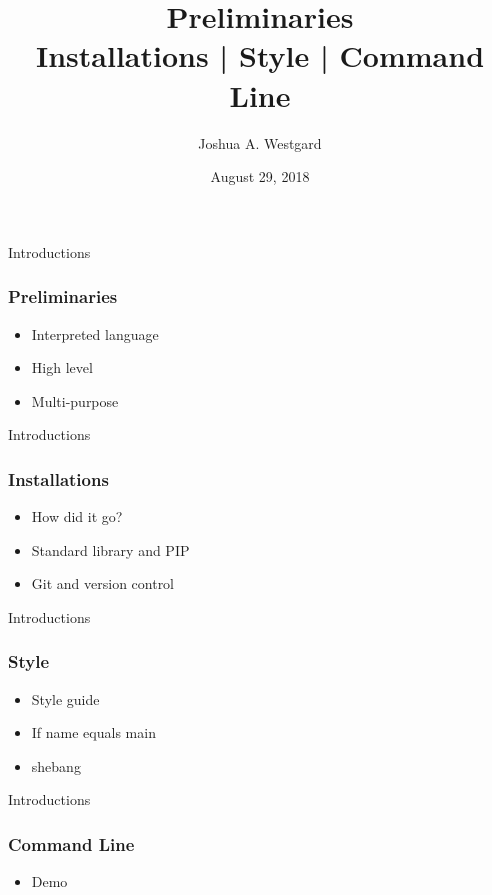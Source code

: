 \documentclass{beamer}
\title[INST: 326: Preliminary Concerns]{Preliminaries\\Installations | Style | Command Line}
\author{Joshua A. Westgard}
\institute{UMD iSchool}
\date{August 29, 2018}
\begin{document}
\begin{frame}
\titlepage
\end{frame}

\begin{frame}{Introductions}
\frametitle{Preliminaries}
\begin{itemize}
\item Interpreted language
\pause \item High level
\pause \item Multi-purpose
\end{itemize}
\end{frame}

\begin{frame}{Introductions}
\frametitle{Installations}
\begin{itemize}
\item How did it go?
\pause \item Standard library and PIP
\pause \item Git and version control
\end{itemize}
\end{frame}

\begin{frame}{Introductions}
\frametitle{Style}
\begin{itemize}
\item Style guide
\pause \item If name equals main
\pause \item shebang
\end{itemize}
\end{frame}

\begin{frame}{Introductions}
\frametitle{Command Line}
\begin{itemize}
\item Demo
\end{itemize}
\end{frame}
\end{document}
